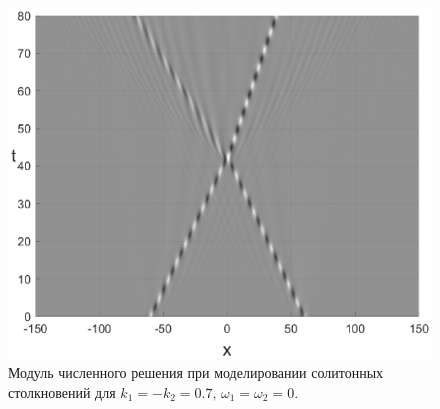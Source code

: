 \documentclass[14pt,a4paper]{extreport}
\begin{document}
\begin{figure}[H]
\begin{minipage}[h]{0.32\linewidth}
				\end{minipage}
				\begin{minipage}[h]{0.32\linewidth}
					\includegraphics[width=1\linewidth]{fig60.eps}
				\end{minipage}
				\caption{Модуль численного решения при моделировании солитонных столкновений для \(k_{1}=-k_{2}=0.7,\,\omega_{1}=\omega_{2}=0\).}
				\label{fig50}
			\end{figure}
\end{document}
